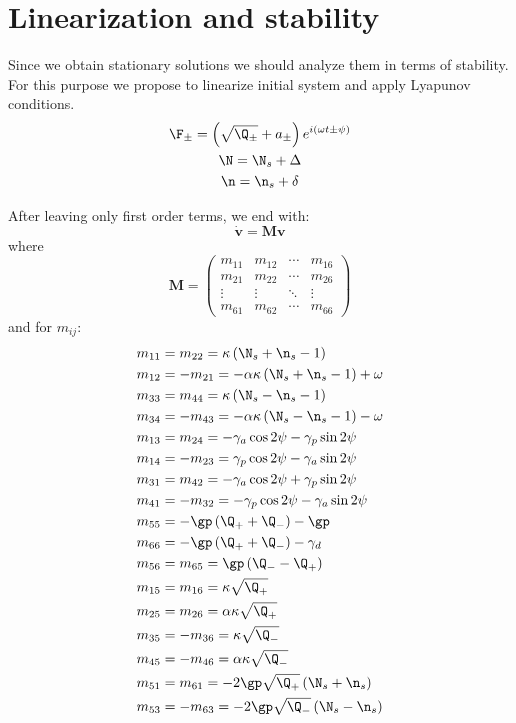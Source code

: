 \documentclass[12pt, notitlepage]{report}
\begin{document}
\section{Linearization and stability}
Since we obtain stationary solutions we should analyze them in terms of stability. For this purpose we propose to linearize initial system and apply Lyapunov conditions. 
\begin{gather}
	\F_\pm = \left(\sqrt{\Q_\pm}+a_\pm\right)e^{i(\omega t \pm \psi)} \\
	\N = \N_s + \Delta \\
	\n = \n_s + \delta
\end{gather}

After leaving only first order terms, we end with:
\newcommand{\bv}{\boldsymbol{v}}
\newcommand{\bM}{\boldsymbol{M}}
\begin{equation}
	\dot{\bv} = \bM\bv
\end{equation}
where
\begin{equation}
	\bM = \begin{pmatrix}
		m_{11} & m_{12} & \cdots & m_{16} \\
		m_{21} & m_{22} & \cdots &m_{26}\\
		\vdots & \vdots & \ddots & \vdots\\
		m_{61} & m_{62} & \cdots&  m_{66} 
	\end{pmatrix}
\end{equation}
and for $m_{ij}$:
\begin{align}
	m_{11} &= m_{22} = \kappa \left(\N_s + \n_s - 1\right)\\
	m_{12} &= -m_{21} = -\alpha\kappa\left(\N_s+\n_s-1\right) + \omega\\
	m_{33} &= m_{44} = \kappa \left(\N_s - \n_s - 1\right) \\
	m_{34} &= -m_{43} = - \alpha\kappa \left(\N_s - \n_s - 1\right) - \omega \\
	m_{13} &= m_{24} = -\gamma_a\cos2\psi - \gamma_p\sin2\psi \\
	m_{14} &= -m_{23} =  \gamma_p\cos2\psi - \gamma_a\sin2\psi \\
	m_{31} &= m_{42} =  -\gamma_a\cos2\psi + \gamma_p\sin2\psi \\
	m_{41} &= -m_{32} =  -\gamma_p\cos2\psi - \gamma_a\sin2\psi \\
	m_{55} &= -\gp\left(\Q_+ + \Q_- \right) - \gp\\
	m_{66} &= - \gp\left(\Q_+ + \Q_-\right) -\gamma_d \\
	m_{56} &= m_{65} = \gp\left(\Q_- - \Q_+\right)	\\
	m_{15} &= m_{16} = \kappa\sqrt{\Q_+}\\
	m_{25} &= m_{26} = \alpha\kappa\sqrt{\Q_+}\\
	m_{35} &= -m_{36} = \kappa\sqrt{\Q_-}\\
	m_{45} &= -m_{46} = \alpha\kappa\sqrt{\Q_-}\\
	m_{51} &= m_{61} = -2\gp\sqrt{\Q_+}\left(\N_s + \n_s\right) \\
	m_{53} &= -m_{63} = -2\gp\sqrt{\Q_-}\left(\N_s - \n_s\right) \\
\end{align}
\end{document}
